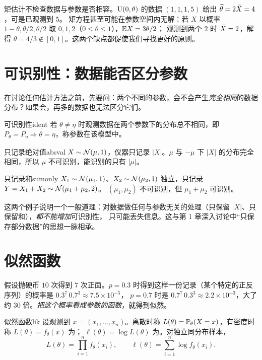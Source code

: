 \begin{warning}
矩估计不检查数据与参数是否相容。$\Unif(0,\theta)$ 的数据 $(1,1,1,5)$ 给出 $\hatt\theta=2\Xbar=4$，可是已观测到 $5$。
矩方程甚至可能在参数空间内无解：若 $X$ 以概率 $1-\theta,\theta/2,\theta/2$ 取 $0,1,2$（$0\le\theta\le1$），$\E X=3\theta/2$；
观测到两个 $2$ 时 $\Xbar=2$，解得 $\theta=4/3\notin[0,1]$。这两个缺点都促使我们寻找更好的原则。
\end{warning}

\section{可识别性：数据能否区分参数}

在讨论任何估计方法之前，先要问：两个不同的参数，会不会产生\emph{完全相同}的数据分布？如果会，再多的数据也无法区分它们。

\begin{definition}{可识别性}{ident}
若 $\theta\ne\eta$ 时观测数据在两个参数下的分布总不相同，即 $P_\theta=P_\eta\Rightarrow\theta=\eta$，称参数在该模型中。
\end{definition}

\begin{example}{只记录绝对值}{absval}
$X\sim\N(\mu,1)$，仪器只记录 $|X|$。$\mu$ 与 $-\mu$ 下 $|X|$ 的分布完全相同，所以 $\mu$ 不可识别，能识别的只有 $|\mu|$。
\end{example}

\begin{example}{只记录和}{sumonly}
$X_1\sim\N(\mu_1,1)$、$X_2\sim\N(\mu_2,1)$ 独立，只记录 $Y=X_1+X_2\sim\N(\mu_1+\mu_2,2)$。
$(\mu_1,\mu_2)$ 不可识别，但 $\mu_1+\mu_2$ 可识别。
\end{example}

这两个例子说明一个一般道理：对数据做任何与参数无关的处理（只保留 $|X|$、只保留和），\emph{都不能增加}可识别性，
只可能丢失信息。这与第 1 章深入讨论中“只保存部分数据”的思想一脉相承。

\section{似然函数}

假设抛硬币 $10$ 次得到 $7$ 次正面。$p=0.3$ 时得到这样一份记录（某个特定的正反序列）的概率是 $0.3^7\,0.7^3\approx7.5\times10^{-5}$，
$p=0.7$ 时是 $0.7^7\,0.3^3\approx2.2\times10^{-3}$，大了约 $30$ 倍。\emph{把这个概率看成参数的函数}，就得到似然。

\begin{definition}{似然函数}{lik}
设观测到 $x=(x_1,\dots,x_n)$。离散时称 $L(\theta)=\P_\theta(X=x)$，有密度时称 $L(\theta)=f_\theta(x)$ 为；
$\ell(\theta)=\log L(\theta)$ 为。对独立同分布样本，
\[
L(\theta)=\prod_{i=1}^nf_\theta(x_i),\qquad \ell(\theta)=\sum_{i=1}^n\log f_\theta(x_i).
\]
\end{definition}

